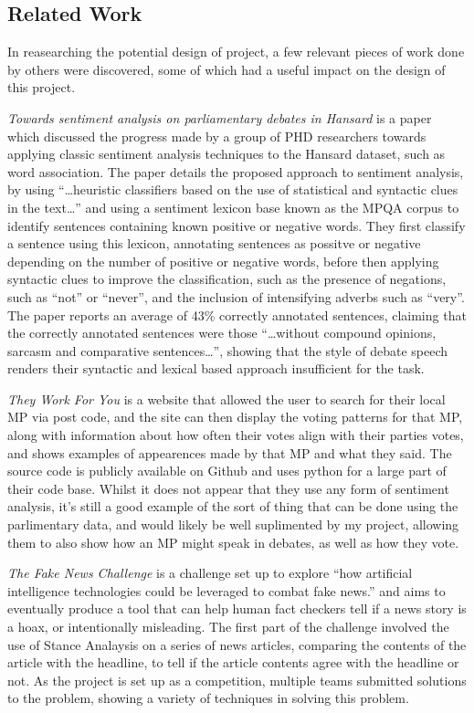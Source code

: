 \subsection{Related Work}
In reasearching the potential design of project, a few relevant pieces of work done by others were discovered, some of which had a useful impact on the design of this project. 

\emph{Towards sentiment analysis on parliamentary debates in Hansard}\cite{Onyimadu2014} is a paper which discussed the progress made by a group of PHD researchers towards applying classic sentiment analysis techniques to the Hansard dataset, such as word association. The paper details the proposed approach to sentiment analysis, by using “…heuristic classifiers based on the use of statistical and syntactic clues in the text…” and using a sentiment lexicon base known as the MPQA corpus to identify sentences containing known positive or negative words. They first classify a sentence using this lexicon, annotating sentences as possitve or negative depending on the number of positive or negative words, before then applying syntactic clues to improve the classification, such as the presence of negations, such as “not” or “never”, and the inclusion of intensifying adverbs such as “very”. The paper reports an average of 43\% correctly annotated sentences, claiming that the correctly annotated sentences were those “…without compound opinions, sarcasm and comparative sentences…”, showing that the style of debate speech renders their syntactic and lexical based approach insufficient for the task.

\emph{They Work For You}\cite{mySociety} is a website that allowed the user to search for their local MP via post code, and the site can then display the voting patterns for that MP, along with information about how often their votes align with their parties votes, and shows examples of appearences made by that MP and what they said. The source code is publicly available on Github and uses python for a large part of their code base. Whilst it does not appear that they use any form of sentiment analysis, it’s still a good example of the sort of thing that can be done using the parlimentary data, and would likely be well suplimented by my project, allowing them to also show how an MP might speak in debates, as well as how they vote.

\emph{The Fake News Challenge}\cite{FakeNewsChallenge2017} is a challenge set up to explore “how artificial intelligence technologies could be leveraged to combat fake news.” and aims to eventually produce a tool that can help human fact checkers tell if a news story is a hoax, or intentionally misleading. The first part of the challenge involved the use of Stance Analaysis on a series of news articles, comparing the contents of the article with the headline, to tell if the article contents agree with the headline or not. As the project is set up as a competition, multiple teams submitted solutions to the problem, showing a variety of techniques in solving this problem. 
